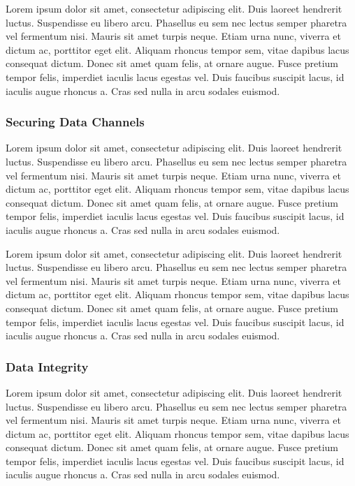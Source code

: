 \documentclass[final,conference,11pt]{IEEEtran}
\begin{document}
Lorem ipsum dolor sit amet, consectetur adipiscing elit. Duis laoreet hendrerit luctus. Suspendisse eu libero arcu. Phasellus eu sem nec lectus semper pharetra vel fermentum nisi. Mauris sit amet turpis neque. Etiam urna nunc, viverra et dictum ac, porttitor eget elit. Aliquam rhoncus tempor sem, vitae dapibus lacus consequat dictum. Donec sit amet quam felis, at ornare augue. Fusce pretium tempor felis, imperdiet iaculis lacus egestas vel. Duis faucibus suscipit lacus, id iaculis augue rhoncus a. Cras sed nulla in arcu sodales euismod.

\subsubsection{Securing Data Channels}
Lorem ipsum dolor sit amet, consectetur adipiscing elit. Duis laoreet hendrerit luctus. Suspendisse eu libero arcu. Phasellus eu sem nec lectus semper pharetra vel fermentum nisi. Mauris sit amet turpis neque. Etiam urna nunc, viverra et dictum ac, porttitor eget elit. Aliquam rhoncus tempor sem, vitae dapibus lacus consequat dictum. Donec sit amet quam felis, at ornare augue. Fusce pretium tempor felis, imperdiet iaculis lacus egestas vel. Duis faucibus suscipit lacus, id iaculis augue rhoncus a. Cras sed nulla in arcu sodales euismod.

Lorem ipsum dolor sit amet, consectetur adipiscing elit. Duis laoreet hendrerit luctus. Suspendisse eu libero arcu. Phasellus eu sem nec lectus semper pharetra vel fermentum nisi. Mauris sit amet turpis neque. Etiam urna nunc, viverra et dictum ac, porttitor eget elit. Aliquam rhoncus tempor sem, vitae dapibus lacus consequat dictum. Donec sit amet quam felis, at ornare augue. Fusce pretium tempor felis, imperdiet iaculis lacus egestas vel. Duis faucibus suscipit lacus, id iaculis augue rhoncus a. Cras sed nulla in arcu sodales euismod.

\subsubsection{Data Integrity}
Lorem ipsum dolor sit amet, consectetur adipiscing elit. Duis laoreet hendrerit luctus. Suspendisse eu libero arcu. Phasellus eu sem nec lectus semper pharetra vel fermentum nisi. Mauris sit amet turpis neque. Etiam urna nunc, viverra et dictum ac, porttitor eget elit. Aliquam rhoncus tempor sem, vitae dapibus lacus consequat dictum. Donec sit amet quam felis, at ornare augue. Fusce pretium tempor felis, imperdiet iaculis lacus egestas vel. Duis faucibus suscipit lacus, id iaculis augue rhoncus a. Cras sed nulla in arcu sodales euismod.
\end{document}
